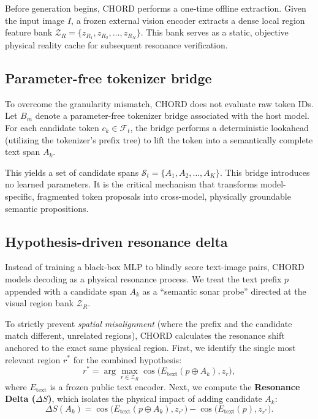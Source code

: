 Before generation begins, CHORD performs a one-time offline extraction. Given the input image $I$, a frozen external vision encoder extracts a dense local region feature bank $\mathcal{Z}_R = \{z_{R_1}, z_{R_2}, \dots, z_{R_N}\}$. This bank serves as a static, objective physical reality cache for subsequent resonance verification.

\subsection{Parameter-free tokenizer bridge}

To overcome the granularity mismatch, CHORD does not evaluate raw token IDs. Let $B_m$ denote a parameter-free tokenizer bridge associated with the host model. For each candidate token $c_k \in \mathcal{F}_t$, the bridge performs a deterministic lookahead (utilizing the tokenizer's prefix tree) to lift the token into a semantically complete text span $A_k$.

This yields a set of candidate spans $\mathcal{S}_t = \{A_1, A_2, \dots, A_K\}$. This bridge introduces no learned parameters. It is the critical mechanism that transforms model-specific, fragmented token proposals into cross-model, physically groundable semantic propositions.

\subsection{Hypothesis-driven resonance delta}

Instead of training a black-box MLP to blindly score text-image pairs, CHORD models decoding as a physical resonance process. We treat the text prefix $p$ appended with a candidate span $A_k$ as a ``semantic sonar probe'' directed at the visual region bank $\mathcal{Z}_R$.

To strictly prevent \emph{spatial misalignment} (where the prefix and the candidate match different, unrelated regions), CHORD calculates the resonance shift anchored to the exact same physical region. First, we identify the single most relevant region $r^*$ for the combined hypothesis:
\begin{equation}
  r^* = \arg\max_{r \in \mathcal{Z}_R} \cos\bigl(E_{\text{text}}(p \oplus A_k), z_r\bigr),
\end{equation}
where $E_{\text{text}}$ is a frozen public text encoder. Next, we compute the \textbf{Resonance Delta ($\Delta S$)}, which isolates the physical impact of adding candidate $A_k$:
\begin{equation}
  \Delta S(A_k) = \cos\bigl(E_{\text{text}}(p \oplus A_k), z_{r^*}\bigr) - \cos\bigl(E_{\text{text}}(p), z_{r^*}\bigr).
\end{equation}

